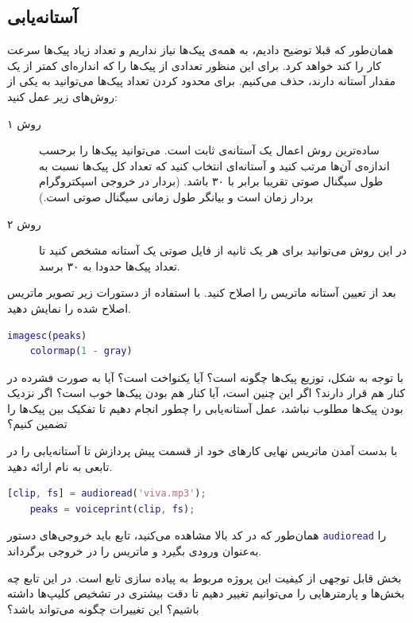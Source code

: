 \documentclass{utsignal}
\begin{document}
	\subsection{آستانه‌یابی} \label{ssec:thresholding}
	همان‌طور که قبلا توضیح دادیم، به همه‌ی پیک‌ها نیاز نداریم و تعداد زیاد پیک‌ها سرعت کار را کند خواهد کرد. برای این منظور تعدادی از پیک‌ها را که انداره‌ای کمتر از یک مقدار آستانه دارند، حذف می‌کنیم. برای محدود کردن تعداد پیک‌ها می‌توانید به یکی از روش‌های زیر عمل کنید:
	\begin{description}
		\item[روش ۱] 
		ساده‌ترین روش اعمال یک آستانه‌ی ثابت است. می‌توانید پیک‌ها را برحسب اندازه‌ی آن‌ها مرتب کنید و آستانه‌ای انتخاب کنید که تعداد کل پیک‌ها نسبت به طول سیگنال صوتی تقریبا برابر با ۳۰ باشد. (بردار  در خروجی اسپکتروگرام بردار زمان است و  بیانگر طول زمانی سیگنال صوتی است.)
		\item[روش ۲]
		در این روش می‌توانید برای هر یک ثانیه از فایل  صوتی یک آستانه مشخص کنید تا تعداد پیک‌ها حدودا به ۳۰ برسد.
	\end{description}
	بعد از تعیین آستانه ماتریس  را اصلاح کنید. با استفاده از دستورات زیر تصویر ماتریس اصلاح شده  را نمایش دهید.
	\begin{latin}
		\begin{lstlisting}[language=Matlab]
	imagesc(peaks)
	colormap(1 - gray)\end{lstlisting}
	\end{latin}
	با توجه به شکل، توزیع پیک‌ها چگونه است؟ آیا یکنواخت است؟	آیا به صورت فشرده در کنار هم قرار دارند؟ اگر این چنین است، آیا کنار هم بودن پیک‌ها خوب است؟ اگر نزدیک بودن پیک‌ها مطلوب نباشد، عمل آستانه‌یابی را چطور انجام دهیم تا تفکیک بین پیک‌ها را تضمین کنیم؟

	با بدست آمدن ماتریس نهایی  کار‌های خود از قسمت پیش پردازش تا آستانه‌یابی را در تابعی به نام  ارائه دهید. 
	\begin{latin}
		\begin{lstlisting}[language=Matlab]
	[clip, fs] = audioread('viva.mp3');
	peaks = voiceprint(clip, fs);\end{lstlisting}
	\end{latin}
	همان‌طور که در کد بالا مشاهده می‌کنید، تابع  باید خروجی‌های دستور \lstinline[language=Matlab]{audioread} را به‌عنوان ورودی بگیرد و ماتریس  را در خروجی برگرداند.
	
	بخش قابل توجهی از کیفیت این پروژه مربوط به پیاده سازی تابع  است. در این تابع چه بخش‌ها و پارمتر‌هایی را می‌توانیم تغییر دهیم تا دقت بیشتری در تشخیص کلیپ‌ها داشته باشیم؟ این تغییرات چگونه می‌تواند باشد؟
\end{document}
